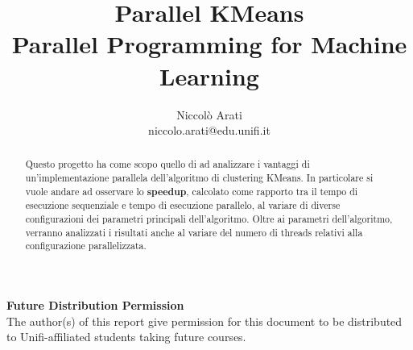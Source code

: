 \documentclass[10pt,twocolumn,letterpaper]{article}
\begin{document}
\title{Parallel KMeans\\
\large Parallel Programming for Machine Learning}

\author{Niccolò Arati\\
niccolo.arati@edu.unifi.it\\
}

\maketitle
\thispagestyle{empty}

\begin{abstract}
   Questo progetto ha come scopo quello di ad analizzare i vantaggi di un'implementazione parallela dell'algoritmo di clustering KMeans. In particolare si vuole andare ad osservare lo \textbf{speedup}, calcolato come rapporto tra il tempo di esecuzione sequenziale e tempo di esecuzione parallelo, al variare di diverse configurazioni dei parametri principali dell'algoritmo. Oltre ai parametri dell'algoritmo, verranno analizzati i risultati anche al variare del numero di threads relativi alla configurazione parallelizzata.
\end{abstract}

\noindent\large\textbf{Future Distribution Permission}\\
\indent The author(s) of this report give permission for this document to be distributed to Unifi-affiliated students taking future courses.
\end{document}
